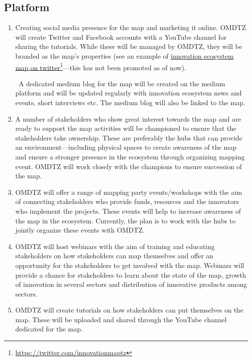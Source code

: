 \documentclass[a4paper,12pt,twoside]{article}
\begin{document}
\subsection{Platform}
\begin{enumerate}
    \item Creating social media presence for the map and marketing it online. OMDTZ will create Twitter and Facebook accounts with a YouTube channel for sharing the tutorials. While  these will be managed by OMDTZ, they will be branded as the map’s properties (see an example of \href{https://twitter.com/innovationmaptz}{innovation ecosystem map on twitter}\footnote{\url{https://twitter.com/innovationmaptz}}---this has not been promoted as of now).
    
    \
    A dedicated medium blog for the map will be created on the medium platform and will be updated regularly with innovation ecosystem news and events, short interviews etc. The medium blog will also be linked to the map.

    \item A number of stakeholders who show great interest towards the map and are ready to support the map activities will be championed to ensure that the stakeholders take ownership. These are preferably the hubs that can provide an environment---including physical spaces to create awareness of the map and ensure a stronger presence in the ecosystem through organizing mapping event. OMDTZ will work closely with the champions to ensure succession of the map.
    \item OMDTZ will offer a range of mapping party events/workshops with the aim of connecting stakeholders who provide funds, resources and the innovators who implement the projects. These events will help to increase awareness of the map in the ecosystem. Currently, the plan is to work with the hubs to jointly organize these events with OMDTZ.
    \item OMDTZ will host webinars with the aim of training and educating stakeholders on how stakeholders can map themselves and offer an opportunity for the stakeholders to get involved with the map. Webinars will provide a chance for stakeholders to learn about the state of the map, growth of innovation in several sectors and distribution of innovative products among sectors.
    \item OMDTZ will create tutorials on how stakeholders can put themselves on the map. These will be uploaded and shared through the YouTube channel dedicated for the map.
\end{enumerate}
\end{document}
